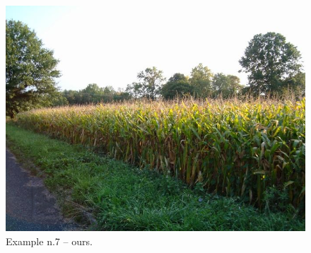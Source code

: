 \documentclass[a4paper, 11pt]{article}
\begin{document}
\begin{figure}
    \centering
    \includegraphics[width=.95\linewidth]{documentation/img/modified/0064.png}
    \caption{Example n.7 -- ours.}
    \label{img:ex_n.7_mask}
\end{figure}
\end{document}
